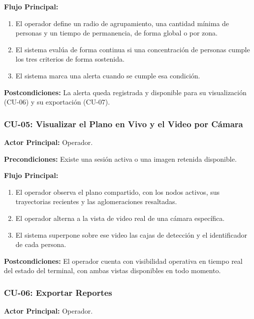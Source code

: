 \textbf{Flujo Principal:}
\begin{enumerate}
  \item El operador define un radio de agrupamiento, una cantidad mínima de personas y un
  tiempo de permanencia, de forma global o por zona.
  \item El sistema evalúa de forma continua si una concentración de personas cumple los tres
  criterios de forma sostenida.
  \item El sistema marca una alerta cuando se cumple esa condición.
\end{enumerate}

\textbf{Postcondiciones:} La alerta queda registrada y disponible para su visualización
(CU-06) y su exportación (CU-07).


\subsubsection{CU-05: Visualizar el Plano en Vivo y el Video por Cámara}
\textbf{Actor Principal:} Operador.

\textbf{Precondiciones:} Existe una sesión activa o una imagen retenida disponible.

\textbf{Flujo Principal:}
\begin{enumerate}
  \item El operador observa el plano compartido, con los nodos activos, sus trayectorias
  recientes y las aglomeraciones resaltadas.
  \item El operador alterna a la vista de video real de una cámara específica.
  \item El sistema superpone sobre ese video las cajas de detección y el identificador de cada
  persona.
\end{enumerate}

\textbf{Postcondiciones:} El operador cuenta con visibilidad operativa en tiempo real del
estado del terminal, con ambas vistas disponibles en todo momento.


\subsubsection{CU-06: Exportar Reportes}
\textbf{Actor Principal:} Operador.

